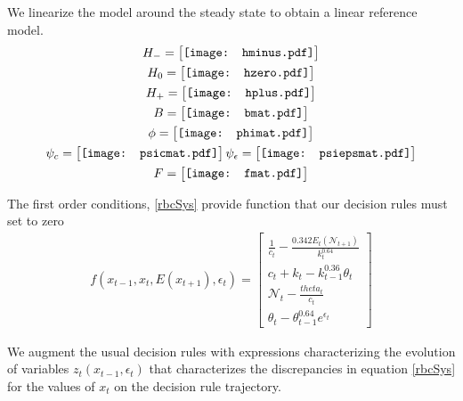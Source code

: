 \documentclass[12pt]{article}
\begin{document}
We linearize the model around the steady state to obtain a linear reference 
model.
\begin{gather*}
H_-=  \begin{bmatrix}
\vcenter{\hbox{\texttt{[image: hminus.pdf]}}}
 \end{bmatrix}\\
H_0=  \begin{bmatrix}
\vcenter{\hbox{\texttt{[image: hzero.pdf]}}}
 \end{bmatrix}\\
H_+=  \begin{bmatrix}
\vcenter{\hbox{\texttt{[image: hplus.pdf]}}}
 \end{bmatrix}\\
B=  \begin{bmatrix}
\vcenter{\hbox{\texttt{[image: bmat.pdf]}}}
 \end{bmatrix}\\
\phi= \begin{bmatrix}
\vcenter{\hbox{\texttt{[image: phimat.pdf]}}}
 \end{bmatrix}\\
\psi_c=\begin{bmatrix}
\vcenter{\hbox{\texttt{[image: psicmat.pdf]}}}
 \end{bmatrix}
\psi_\epsilon=\begin{bmatrix}
\vcenter{\hbox{\texttt{[image: psiepsmat.pdf]}}}
 \end{bmatrix}\\
F=\begin{bmatrix}
\vcenter{\hbox{\texttt{[image: fmat.pdf]}}}
 \end{bmatrix}\\
\end{gather*}


The first order conditions, \ref{rbcSys} provide function that our decision rules must set to zero
\begin{gather*}
f(x_{t-1},x_t,E(x_{t+1}),\epsilon_t)=  \begin{bmatrix}
\frac{1}{c_t} - \frac{0.342 E_t(\mathcal{N}_{t+1})}{k_t^{0.64}}\\
c_t + k_t - k_{t-1}^{0.36}\theta_t\\
\mathcal{N}_t - \frac{theta_t}{c_t}\\
 \theta_t -\theta_{t-1}^{0.64} e^{\epsilon_t}
  \end{bmatrix}
\end{gather*}


We augment the usual decision rules with expressions characterizing the evolution of variables $z_t(x_{t-1},\epsilon_t)$ that 
characterizes the discrepancies in equation \ref{rbcSys} 
for the values of $x_t$ on the decision rule trajectory.
\end{document}
